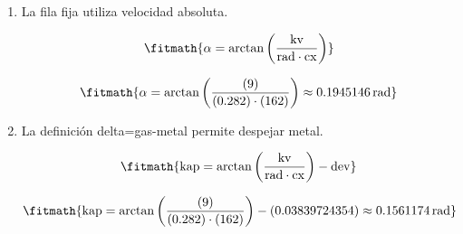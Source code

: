 \begin{enumerate}

\item La fila fija utiliza velocidad absoluta.

\[\fitmath{\alpha=\arctan\left(\frac{\mathrm{kv}}{\mathrm{rad}\cdot \mathrm{cx}}\right)}\]

\[\fitmath{\alpha=\arctan\left(\frac{(9)}{(0.282)\cdot (162)}\right)\approx 0.1945146\,\mathrm{rad}}\]

\item La definición delta=gas-metal permite despejar metal.

\[\fitmath{\mathrm{kap}=\arctan\left(\frac{\mathrm{kv}}{\mathrm{rad}\cdot \mathrm{cx}}\right)-\mathrm{dev}}\]

\[\fitmath{\mathrm{kap}=\arctan\left(\frac{(9)}{(0.282)\cdot (162)}\right)-(0.03839724354)\approx 0.1561174\,\mathrm{rad}}\]

\end{enumerate}
